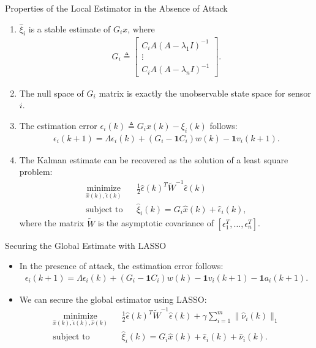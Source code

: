 \documentclass[10pt]{beamer}
\begin{document}
\begin{frame}{Properties of the Local Estimator in the Absence of Attack}
  \begin{enumerate}
    \item $\hat \xi_i$ is a stable estimate of $G_ix$, where
      \begin{align*}
	G_{i} \triangleq
	\begin{bmatrix}
	  C_{i} A\left(A-\lambda_{1} I\right)^{-1} \\
	  \vdots \\
	  C_{i} A\left(A-\lambda_{n} I\right)^{-1}
	\end{bmatrix}.
      \end{align*}
    \item The null space of $G_i$ matrix is exactly the unobservable state space for sensor $i$.
    \item  The estimation error $\epsilon_i(k)\triangleq G_i x(k)-\xi_i(k)$ follows:
      \begin{align*}
	\epsilon_{i}(k+1)= \Lambda \epsilon_{i}(k)+\left(G_{i}-\mathbf{1} C_{i}\right) w(k) -\mathbf{1} v_{i}(k+1).
      \end{align*}
    \item The Kalman estimate can be recovered as the solution of a least square problem:
      \begin{align*}
      &\mathop{\textrm{minimize}}\limits_{\hat x(k),\hat \epsilon(k)}&
      & \frac{1}{2}\hat \epsilon(k)^T \tilde W^{-1} \hat \epsilon(k)\\
      &\textrm{subject to} &
      &\hat \xi_i(k)  =  G_i\hat x(k) + \hat \epsilon_i(k),&
      \end{align*}
      where the matrix $\tilde W$ is the asymptotic covariance of $[\epsilon_1^T,\ldots ,\epsilon_n^T]$.
  \end{enumerate}
\end{frame}

\begin{frame}{Securing the Global Estimate with LASSO}
  \begin{itemize}
    \item  In the presence of attack, the estimation error follows:
      \begin{align*}
	\epsilon_{i}(k+1)= \Lambda \epsilon_{i}(k)+\left(G_{i}-\mathbf{1} C_{i}\right) w(k) -\mathbf{1} v_{i}(k+1) - \mathbf{1} a_{i}(k+1) .
      \end{align*}
    \item We can secure the global estimator using LASSO:
      \begin{align*}
    &\mathop{\textrm{minimize}}\limits_{\hat x(k),\hat \epsilon(k), \hat \nu(k)}&
    & \frac{1}{2}\hat \epsilon(k)^T \tilde W^{-1} \hat \epsilon(k) + \gamma \sum_{i=1}^m \|\hat \nu_i(k)\|_1\\
    &\textrm{subject to} &
    &\hat \xi_i(k)  =  G_i\hat x(k) + \hat \epsilon_i(k)+\hat \nu_i(k).&
      \end{align*}
  \end{itemize}
\end{frame}
\end{document}
